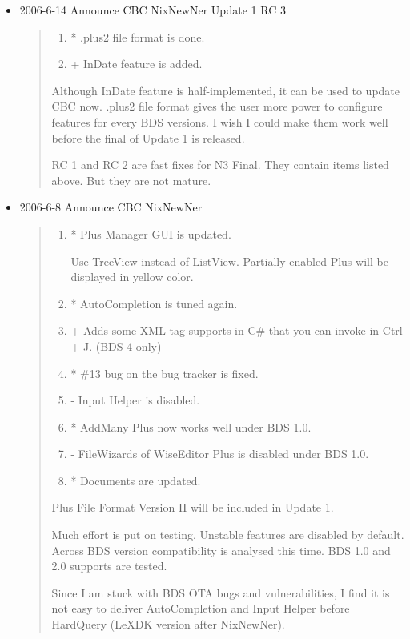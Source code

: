 \begin{itemize}
  \item 2006-6-14 Announce CBC NixNewNer Update 1 RC 3

  \begin{quotation}
    \begin{enumerate}
      \item * .plus2 file format is done.
      \item + InDate feature is added.
    \end{enumerate}
    Although InDate feature is half-implemented, it can be used to
    update CBC now. .plus2 file format gives the user more power to
    configure features for every BDS versions. I wish I could make them
    work well before the final of Update 1 is released.

    RC 1 and RC 2 are fast fixes for N3 Final. They contain items listed
    above. But they are not mature.
  \end{quotation}
  \item 2006-6-8 Announce CBC NixNewNer

  \begin{quotation}
    \begin{enumerate}
      \item * Plus Manager GUI is updated.

      Use TreeView instead of ListView. Partially enabled Plus will be
      displayed in yellow color.

      \item * AutoCompletion is tuned again.
      \item + Adds some XML tag supports in C\# that you can invoke in
      Ctrl + J. (BDS 4 only)
      \item * \#13 bug on the bug tracker is fixed.
      \item - Input Helper is disabled.
      \item * AddMany Plus now works well under BDS 1.0.
      \item - FileWizards of WiseEditor Plus is disabled under BDS 1.0.
      \item * Documents are updated.
    \end{enumerate}

    Plus File Format Version II will be included in Update 1.

    Much effort is put on testing. Unstable features are disabled by
    default. Across BDS version compatibility is analysed this time. BDS
    1.0 and 2.0 supports are tested.

    Since I am stuck with BDS OTA bugs and vulnerabilities, I find it is
    not easy to deliver AutoCompletion and Input Helper before HardQuery
    (LeXDK version after NixNewNer).


\end{quotation}
\end{itemize}
